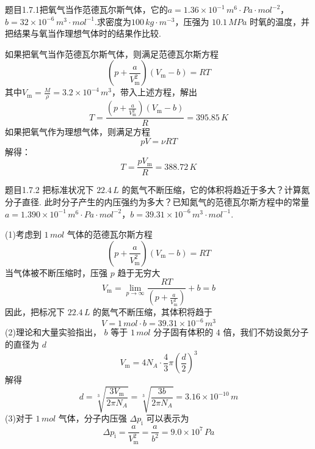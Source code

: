 \begin{question}{题目1.7.1}把氧气当作范德瓦尔斯气体，它的$a = 1.36 \times 10^{-1} \,\si{m^6 \cdot Pa \cdot mol^{-2}}$，$b = 32 \times 10^{-6} \,\si{m^3 \cdot mol^{-1}}$.求密度为$100\,\si{kg \cdot m^{-3}}$，压强为 $10.1\,\si{MPa}$ 时氧的温度，并把结果与氧当作理想气体时的结果作比较.
\end{question}
\begin{solution}
    如果把氧气当作范德瓦尔斯气体，则满足范德瓦尔斯方程
    $$
        \left(p+\frac{a}{V_\mathrm{m}^2}\right)\left(V_\mathrm{m}-b\right) = RT
    $$
    其中$V_\mathrm{m} = \frac{M}{\rho} = 3.2 \times 10^{-4} \,\si{m^3}$，带入上述方程，解出
    $$
        T
        = \frac{\left(p+\frac{a}{V_\mathrm{m}^2}\right)\left(V_\mathrm{m}-b\right)}{R}
        = 395.85 \,\si{K}
    $$
    如果把氧气作为理想气体，则满足方程
    $$
        pV = \nu RT
    $$
    解得：
    $$
        T = \frac{pV_\mathrm{m}}{R} = 388.72 \,\si{K}
    $$
\end{solution}
\begin{question}{题目1.7.2}
    把标准状况下 $22.4 \,\si{L}$ 的氮气不断压缩，它的体积将趋近于多大？计算氮分子直径. 此时分子产生的内压强约为多大？已知氮气的范德瓦尔斯方程中的常量$a=1.390 \times 10^{-1} \,\si{m^6 \cdot Pa \cdot mol^{-2}}$，$b=39.31 \times 10^{-6}\,\si{m^3 \cdot mol^{-1}}$.
\end{question}
\begin{solution}
    (1)考虑到 $1 \,\si{mol}$ 气体的范德瓦尔斯方程
    $$
        \left(p+\frac{a}{V_\mathrm{m}^2}\right)\left(V_\mathrm{m}-b\right)=RT
    $$
    当气体被不断压缩时，压强 $p$ 趋于无穷大
    $$
        V_\mathrm{m} = \lim\limits_{p \to \infty} \frac{RT}{\left(p+\frac{a}{V_\mathrm{m}^2}\right)} + b = b
    $$
    因此，把标况下 $22.4 \,\si{L}$ 的氮气不断压缩，其体积将趋于
    $$
        V = 1 \,\si{mol} \cdot b = 39.31 \times 10^{-6} \,\si{m^3}
    $$
    (2)理论和大量实验指出， $b$ 等于 $1\,\si{mol}$ 分子固有体积的 $4$ 倍，我们不妨设氮分子的直径为 $d$
    $$
        V_\mathrm{m} = 4 N_A \cdot \frac{4}{3}\pi\left(\frac{d}{2}\right)^3
    $$
    解得
    $$
        d = \sqrt[3]{\frac{3V_\mathrm{m}}{2 \pi N_A}} = \sqrt[3]{\frac{3b}{2 \pi N_A}} = 3.16 \times 10^{-10} \,\si{m}
    $$
    (3)对于 $1 \,\si{mol}$ 气体，分子内压强 $\Delta p_\mathrm{i}$ 可以表示为
    $$
        \Delta p_\mathrm{i}
        = \frac{a}{V_\mathrm{m}^2}
        = \frac{a}{b^2}
        = 9.0 \times 10^{7} \,\si{Pa}
    $$
\end{solution}